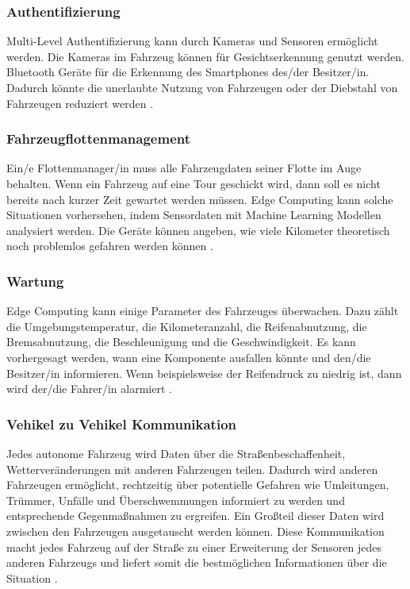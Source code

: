\documentclass{sigchi}
\begin{document}
\subsubsection{Authentifizierung}
Multi-Level Authentifizierung kann durch Kameras und Sensoren ermöglicht werden. Die Kameras im Fahrzeug können für Gesichtserkennung genutzt werden. Bluetooth Geräte für die Erkennung des Smartphones des/der Besitzer/in. Dadurch könnte die unerlaubte Nutzung von Fahrzeugen oder der Diebstahl von Fahrzeugen reduziert werden \cite{role-edge-computing:2020}.

\subsubsection{Fahrzeugflottenmanagement}
Ein/e Flottenmanager/in muss alle Fahrzeugdaten seiner Flotte im Auge behalten. Wenn ein Fahrzeug auf eine Tour geschickt wird, dann soll es nicht bereits nach kurzer Zeit gewartet werden müssen. Edge Computing kann solche Situationen vorhersehen, indem Sensordaten mit Machine Learning Modellen analysiert werden. Die Geräte können angeben, wie viele Kilometer theoretisch noch problemlos gefahren werden können \cite{role-edge-computing:2020}.

\subsubsection{Wartung}
Edge Computing kann einige Parameter des Fahrzeuges überwachen. Dazu zählt die Umgebungstemperatur, die Kilometeranzahl, die Reifenabnutzung, die Bremsabnutzung, die Beschleunigung und die Geschwindigkeit. Es kann vorhergesagt werden, wann eine Komponente ausfallen könnte und den/die Besitzer/in informieren. Wenn beispielsweise der Reifendruck zu niedrig ist, dann wird der/die Fahrer/in alarmiert \cite{role-edge-computing:2020}.

\subsubsection{Vehikel zu Vehikel Kommunikation}
Jedes autonome Fahrzeug wird Daten über die Straßenbeschaffenheit, Wetterveränderungen mit anderen Fahrzeugen teilen. Dadurch wird anderen Fahrzeugen ermöglicht, rechtzeitig über potentielle Gefahren wie Umleitungen, Trümmer, Unfälle und Überschwemmungen informiert zu werden und entsprechende Gegenmaßnahmen zu ergreifen. Ein Großteil dieser Daten wird zwischen den Fahrzeugen ausgetauscht werden können. Diese Kommunikation macht jedes Fahrzeug auf der Straße zu einer Erweiterung der Sensoren jedes anderen Fahrzeugs und liefert somit die bestmöglichen Informationen über die Situation \cite{5-use-cases:2019}.
\end{document}
